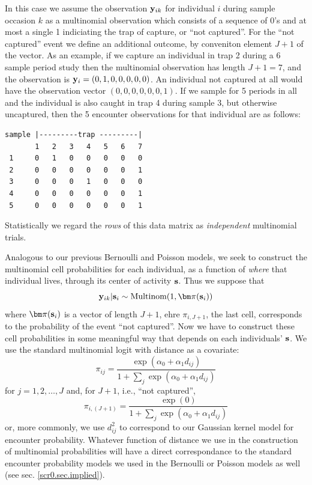 In this case we assume the observation ${\bf y}_{ik}$ for individual
$i$ during sample occasion $k$ as a multinomial observation which
consists of a sequence of 0's and at most a single 1 indiciating the
trap of capture, or ``not captured''. For the ``not captured'' event
we define an additional outcome, by conveniton element $J+1$ of the
vector.  As an example, if we capture an individual in trap 2 during a
6 sample period study then the multinomial observation has length $J+1
= 7$, and the observation is ${\bf y}_{i} = (0,1,0,0,0,0,0)$. An
individual not captured at all would have the observation vector
$(0,0,0,0,0,0,1)$.  If we sample for 5 periods in all and the
individual is also caught in trap 4 during sample 3, but otherwise
uncaptured, then the 5 encounter observations for that individual are
as follows:
\begin{verbatim}
sample |---------trap ---------|
       1   2   3   4   5   6   7
 1     0   1   0   0   0   0   0
 2     0   0   0   0   0   0   1
 3     0   0   0   1   0   0   0
 4     0   0   0   0   0   0   1
 5     0   0   0   0   0   0   1
\end{verbatim}
Statistically we regard the {\it rows} of this data matrix as {\it
  independent} multinomial trials.

Analogous to our previous Bernoulli and Poisson models, we seek to
construct the multinomial cell probabilities for each individual, as a
function of {\it where} that individual lives, through its center of
activity ${\bf s}$. Thus we suppose that
\begin{equation}
 {\bf y}_{ik}|{\bf s}_{i} \sim \mbox{Multinom}(1, {\bm \pi}({\bf s}_{i}) )
\label{poisson-mn.eq.mn}
\end{equation}
where ${\bm \pi}({\bf s}_{i})$ is a vector of length $J+1$, ehre
 $\pi_{i,J+1}$, the last cell, corresponds
 to the probability of the event ``not captured''.
Now we have to
construct these cell probabilities in some meaningful way that depends
on each individuals' ${\bf s}$.
We use the standard
multinomial logit with distance as a covariate:
\[
 \pi_{ij} = \frac{  \exp(\alpha_{0} + \alpha_{1} d_{ij}) }{ 1+ \sum_{j}
   \exp(\alpha_{0} + \alpha_{1} d_{ij})}
\]
for $j=1,2,\ldots,J$ and, for $J+1$, i.e., ``not captured'',
\[
 \pi_{i,(J+1)} = \frac{  \exp(0) }
                    { 1+ \sum_{j} \exp(\alpha_{0} + \alpha_{1} d_{ij})}
\]
or, more commonly, we use $d_{ij}^{2}$ to correspond to our Gaussian
kernel model for encounter probability. Whatever function of distance
we use in the construction of multinomial probabilities will have a
direct correspondance to the standard encounter probability models we
used in the Bernoulli or Poisson models as well (see
sec. \ref{scr0.sec.implied}). 

